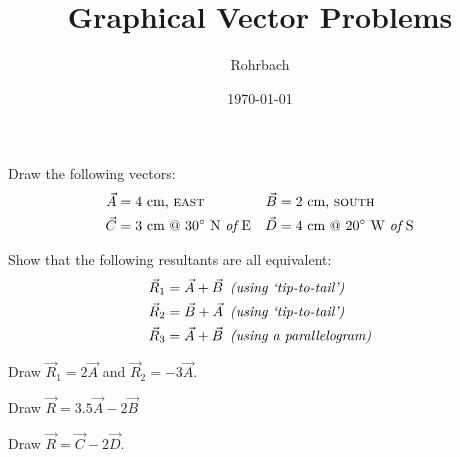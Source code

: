 \documentclass[10pt]{exam}
\title{Graphical Vector Problems}
\author{Rohrbach}
\date{\today}
\begin{document}
\maketitle

\begin{questions}
  

\question
  Draw the following vectors:
  \begin{align*}
    \vec{A} &= 4~\text{cm, \sc east} &
    \vec{B} &= 2~\text{cm, \sc south} \\
    \vec{C} &= 3~\text{cm @ } 30^\circ \text{ N {\it of} E} &
    \vec{D} &= 4~\text{cm @ } 20^\circ \text{ W {\it of} S}
  \end{align*}



\question
  Show that the following resultants are all equivalent:
  \begin{align*}
    \vec{R}_1 &= \vec{A} + \vec{B} 
    \,\,\, \text{\it (using `tip-to-tail')} \\
    \vec{R}_2 &= \vec{B} + \vec{A}
    \,\,\, \text{\it (using `tip-to-tail')} \\
    \vec{R}_3 &= \vec{A} + \vec{B} 
    \,\,\, \text{\it (using a parallelogram)}
  \end{align*}



\question
  Draw $\vec{R}_1=2\vec{A}$ and $\vec{R}_2=-3\vec{A}$.



\question
  Draw $\vec{R}=3.5\vec{A}-2\vec{B}$



\question
  Draw $\vec{R}=\vec{C}-2\vec{D}$.


\end{questions}
\end{document}
